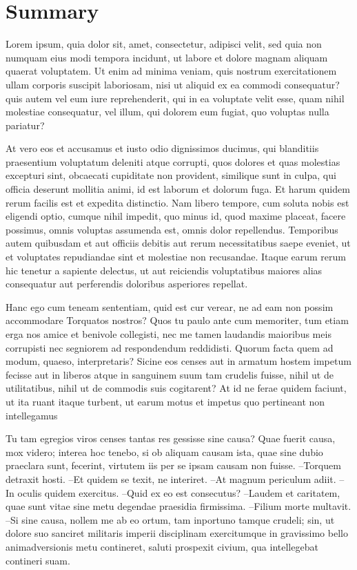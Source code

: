 \chapter{Summary}%
\label{chap:summary}

Lorem ipsum, quia dolor sit, amet, consectetur, adipisci velit, sed quia non numquam eius modi tempora incidunt, ut labore et dolore magnam aliquam quaerat voluptatem. Ut enim ad minima veniam, quis nostrum exercitationem ullam corporis suscipit laboriosam, nisi ut aliquid ex ea commodi consequatur? quis autem vel eum iure reprehenderit, qui in ea voluptate velit esse, quam nihil molestiae consequatur, vel illum, qui dolorem eum fugiat, quo voluptas nulla pariatur?

At vero eos et accusamus et iusto odio dignissimos ducimus, qui blanditiis praesentium voluptatum deleniti atque corrupti, quos dolores et quas molestias excepturi sint, obcaecati cupiditate non provident, similique sunt in culpa, qui officia deserunt mollitia animi, id est laborum et dolorum fuga. Et harum quidem rerum facilis est et expedita distinctio. Nam libero tempore, cum soluta nobis est eligendi optio, cumque nihil impedit, quo minus id, quod maxime placeat, facere possimus, omnis voluptas assumenda est, omnis dolor repellendus.
Temporibus autem quibusdam et aut officiis debitis aut rerum necessitatibus saepe eveniet, ut et voluptates repudiandae sint et molestiae non recusandae. Itaque earum rerum hic tenetur a sapiente delectus, ut aut reiciendis voluptatibus maiores alias consequatur aut perferendis doloribus asperiores repellat.

Hanc ego cum teneam sententiam, quid est cur verear, ne ad eam non possim accommodare Torquatos nostros? Quos tu paulo ante cum memoriter, tum etiam erga nos amice et benivole collegisti, nec me tamen laudandis maioribus meis corrupisti nec segniorem ad respondendum reddidisti. Quorum facta quem ad modum, quaeso, interpretaris? Sicine eos censes aut in armatum hostem impetum fecisse aut in liberos atque in sanguinem suum tam crudelis fuisse, nihil ut de utilitatibus, nihil ut de commodis suis cogitarent? At id ne ferae quidem faciunt, ut ita ruant itaque turbent, ut earum motus et impetus quo pertineant non intellegamus

Tu tam egregios viros censes tantas res gessisse sine causa? Quae fuerit causa, mox videro; interea hoc tenebo, si ob aliquam causam ista, quae sine dubio praeclara sunt, fecerint, virtutem iis per se ipsam causam non fuisse.
--Torquem detraxit hosti.
--Et quidem se texit, ne interiret.
--At magnum periculum adiit.
--In oculis quidem exercitus.
--Quid ex eo est consecutus?
--Laudem et caritatem, quae sunt vitae sine metu degendae praesidia firmissima.
--Filium morte multavit.
--Si sine causa, nollem me ab eo ortum, tam inportuno tamque crudeli; sin, ut dolore suo sanciret militaris imperii disciplinam exercitumque in gravissimo bello animadversionis metu contineret, saluti prospexit civium, qua intellegebat contineri suam.


